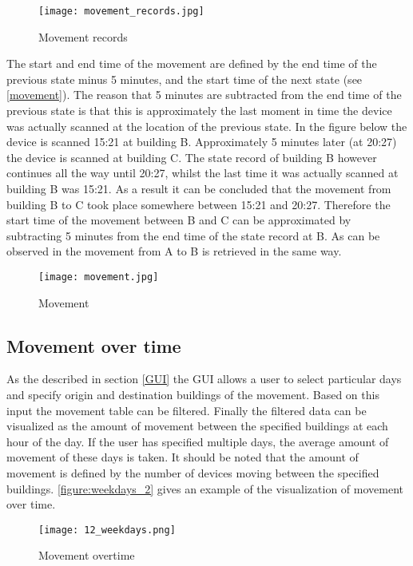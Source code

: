 \begin{figure}[H]
\centering
\texttt{[image: movement\_records.jpg]}
\captionsetup{justification=centering}
\caption{Movement records}
\label{figure:movementrecs}
\end{figure}

The start and end time of the movement are defined by the end time of the previous state minus 5 minutes, and the start time of the next state (see \autoref{movement}). The reason that 5 minutes are subtracted from the end time of the previous state is that this is approximately the last moment in time the device was actually scanned at the location of the previous state. In the figure below the device is scanned 15:21 at building B. Approximately 5 minutes later (at 20:27) the device is scanned at building C. The state record of building B however continues all the way until 20:27, whilst the last time it was actually scanned at building B was 15:21. As a result it can be concluded that the movement from building B to C took place somewhere between 15:21 and 20:27. Therefore the start time of the movement between B and C can be approximated by subtracting 5 minutes from the end time of the state record at B. As can be observed in the movement from A to B is retrieved in the same way.

\begin{figure}[H]
\centering
\texttt{[image: movement.jpg]}
\captionsetup{justification=centering}
\caption{Movement}
\label{figure:movement}
\end{figure}

\subsection{Movement over time}
As the described in section \autoref{GUI} the GUI allows a user to select particular days and specify origin and destination buildings of the movement. Based on this input the movement table can be filtered. Finally the filtered data can be visualized as the amount of movement between the specified buildings at each hour of the day. If the user has specified multiple days, the average amount of movement of these days is taken. It should be noted that the amount of movement is defined by the number of devices moving between the specified buildings. \autoref{figure:weekdays_2} gives an example of the visualization of movement over time.
\begin{figure}[H]
\centering
\texttt{[image: 12\_weekdays.png]}
\captionsetup{justification=centering}
\caption{Movement overtime}
\label{figure:weekdays_2}
\end{figure}

